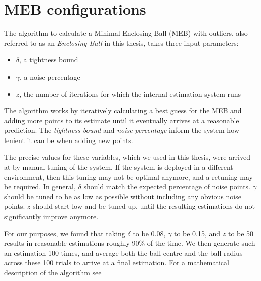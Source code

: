 \chapter{MEB configurations}
\label{appendix: meb configuration}

The algorithm to calculate a Minimal Enclosing Ball (MEB) with outliers, also referred to as an \textit{Enclosing Ball} in this thesis, takes three input parameters:
\begin{itemize}
    \item $\delta$, a tightness bound
    \item $\gamma$, a noise percentage
    \item $z$, the number of iterations for which the internal estimation system runs
\end{itemize}

The algorithm works by iteratively calculating a best guess for the MEB and adding more points to its estimate until it eventually arrives at a reasonable prediction.
The \textit{tightness bound} and \textit{noise percentage} inform the system how lenient it can be when adding new points.

The precise values for these variables, which we used in this thesis, were arrived at by manual tuning of the system.
If the system is deployed in a different environment, then this tuning may not be optimal anymore, and a retuning may be required.
In general, $\delta$ should match the expected percentage of noise points.
$\gamma$ should be tuned to be as low as possible without including any obvious noise points.
$z$ should start low and be tuned up, until the resulting estimations do not significantly improve anymore.

For our purposes, we found that taking $\delta$ to be 0.08, $\gamma$ to be 0.15, and $z$ to be 50 results in reasonable estimations roughly 90\% of the time.
We then generate such an estimation 100 times, and average both the ball centre and the ball radius across these 100 trials to arrive at a final estimation.
For a mathematical description of the algorithm see \cite[Algorithm 1]{ding2020sublinear}